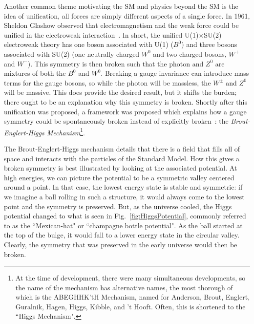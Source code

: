 Another common theme motivating the SM and physics beyond the SM is the idea of unification, all forces are simply different aspects of a single force. In 1961, Sheldon Glashow observed that electromagnetism and the weak force could be unified in the electroweak interaction~\cite{Glashow:1961}. In short, the unified U(1)$\times$SU(2) electroweak theory has one boson associated with U(1) ($B^{0}$) and three bosons associated with SU(2) (one neutrally charged $W^{0}$ and two charged bosons, $W^{+}$ and $W^{-}$). This symmetry is then broken such that the photon and $Z^{0}$ are mixtures of both the $B^{0}$ and $W^{0}$. Breaking a gauge invariance can introduce mass terms for the gauge bosons, so while the photon will be massless, the $W^{\pm}$ and $Z^{0}$ will be massive. This does provide the desired result, but it shifts the burden; there ought to be an explanation why this symmetry is broken. Shortly after this unification was proposed, a framework was proposed which explains how a gauge symmetry could be spontaneously broken instead of explicitly broken~\cite{Anderson:1963,Higgs:1964pj,Englert:1964et,Higgs:1964ia,Guralnik:1964eu}: the \textit{Brout-Englert-Higgs Mechanism}\footnote{At the time of development, there were many simultaneous developments, so the name of the mechanism has alternative names, the most thorough of which is the ABEGHHK'tH Mechanism, named for Anderson, Brout, Englert, Guralnik, Hagen, Higgs, Kibble, and 't Hooft. Often, this is shortened to the ``Higgs Mechanism".}. 

The Brout-Englert-Higgs mechanism details that there is a field that fills all of space and interacts with the particles of the Standard Model. How this gives a broken symmetry is best illustrated by looking at the associated potential. At high energies, we can picture the potential to be a symmetric valley centered around a point. In that case, the lowest energy state is stable and symmetric: if we imagine a ball rolling in such a structure, it would always come to the lowest point and the symmetry is preserved. But, as the universe cooled, the Higgs potential changed to what is seen in Fig.~\ref{fig:HiggsPotential}, commonly referred to as the ``Mexican-hat" or ``champagne bottle potential". As the ball started at the top of the bulge, it would fall to a lower energy state in the circular valley. Clearly, the symmetry that was preserved in the early universe would then be broken.

